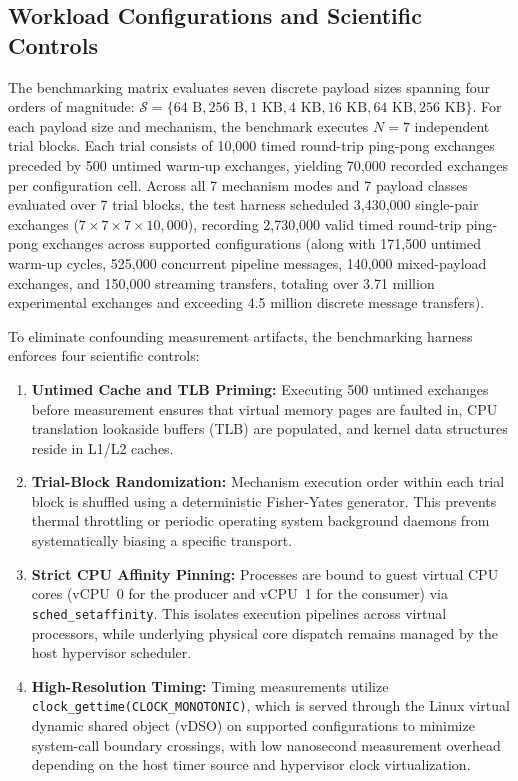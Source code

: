 \subsection{Workload Configurations and Scientific Controls}
The benchmarking matrix evaluates seven discrete payload sizes spanning four orders of magnitude: $\mathcal{S} = \{64\text{ B}, 256\text{ B}, 1\text{ KB}, 4\text{ KB}, 16\text{ KB}, 64\text{ KB}, 256\text{ KB}\}$.
For each payload size and mechanism, the benchmark executes $N = 7$ independent trial blocks. Each trial consists of 10,000 timed round-trip ping-pong exchanges preceded by 500 untimed warm-up exchanges, yielding 70,000 recorded exchanges per configuration cell. Across all 7 mechanism modes and 7 payload classes evaluated over 7 trial blocks, the test harness scheduled 3,430,000 single-pair exchanges ($7 \times 7 \times 7 \times 10,000$), recording 2,730,000 valid timed round-trip ping-pong exchanges across supported configurations (along with 171,500 untimed warm-up cycles, 525,000 concurrent pipeline messages, 140,000 mixed-payload exchanges, and 150,000 streaming transfers, totaling over 3.71 million experimental exchanges and exceeding 4.5 million discrete message transfers).

To eliminate confounding measurement artifacts, the benchmarking harness enforces four scientific controls:
\begin{enumerate}[leftmargin=*,noitemsep,topsep=1.5pt]
    \item \textbf{Untimed Cache and TLB Priming:} Executing 500 untimed exchanges before measurement ensures that virtual memory pages are faulted in, CPU translation lookaside buffers (TLB) are populated, and kernel data structures reside in L1/L2 caches.
    \item \textbf{Trial-Block Randomization:} Mechanism execution order within each trial block is shuffled using a deterministic Fisher-Yates generator. This prevents thermal throttling or periodic operating system background daemons from systematically biasing a specific transport.
    \item \textbf{Strict CPU Affinity Pinning:} Processes are bound to guest virtual CPU cores (vCPU~0 for the producer and vCPU~1 for the consumer) via \texttt{sched\_setaffinity}. This isolates execution pipelines across virtual processors, while underlying physical core dispatch remains managed by the host hypervisor scheduler.
    \item \textbf{High-Resolution Timing:} Timing measurements utilize \texttt{clock\_gettime(CLOCK\_MONOTONIC)}, which is served through the Linux virtual dynamic shared object (vDSO) on supported configurations to minimize system-call boundary crossings, with low nanosecond measurement overhead depending on the host timer source and hypervisor clock virtualization.
\end{enumerate}

